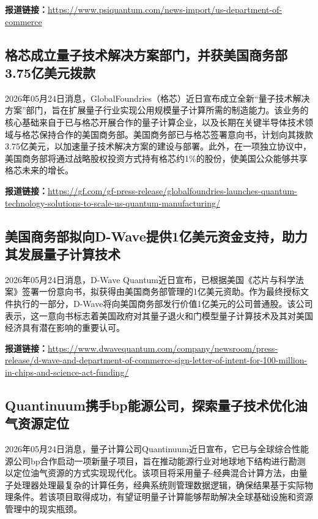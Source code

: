 \documentclass[12pt,a4paper]{ctexart}
\begin{document}
\noindent\textbf{报道链接：}\url{https://www.psiquantum.com/news-import/us-department-of-commerce}

\subsection{ 格芯成立量子技术解决方案部门，并获美国商务部3.75亿美元拨款 }

2026年05月24日消息，GlobalFoundries（格芯）近日宣布成立全新“量子技术解决方案”部门，旨在扩展量子行业实现公用规模量子计算所需的制造能力。该业务的核心基础来自于已与格芯开展合作的量子计算企业，以及长期在关键半导体技术领域与格芯保持合作的美国商务部。美国商务部已与格芯签署意向书，计划向其拨款3.75亿美元，以加速量子技术解决方案的建设与部署。此外，在一项独立协议中，美国商务部将通过战略股权投资方式持有格芯约1\%的股份，使美国公众能够共享格芯未来的增长。

\noindent\textbf{报道链接：}\url{https://gf.com/gf-press-release/globalfoundries-launches-quantum-technology-solutions-to-scale-us-quantum-manufacturing/}

\subsection{ 美国商务部拟向D-Wave提供1亿美元资金支持，助力其发展量子计算技术 }

2026年05月24日消息，D-Wave Quantum近日宣布，已根据美国《芯片与科学法案》签署一份意向书，拟获得由美国商务部管理的1亿美元资助。作为最终授标文件执行的一部分，D-Wave将向美国商务部发行价值1亿美元的公司普通股。该公司表示，这一意向书标志着美国政府对其量子退火和门模型量子计算技术及其对美国经济具有潜在影响的重要认可。

\noindent\textbf{报道链接：}\url{https://www.dwavequantum.com/company/newsroom/press-release/d-wave-and-department-of-commerce-sign-letter-of-intent-for-100-million-in-chips-and-science-act-funding/}

\subsection{ Quantinuum携手bp能源公司，探索量子技术优化油气资源定位 }

2026年05月24日消息，量子计算公司Quantinuum近日宣布，它已与全球综合性能源公司bp合作启动一项新量子项目，旨在推动能源行业对地球地下结构进行勘测以定位油气资源的方式实现现代化。该项目将采用量子-经典混合计算方法，由量子处理器处理最复杂的计算任务，经典系统则管理数据逻辑，确保结果基于实际物理条件。若该项目取得成功，有望证明量子计算能够帮助解决全球基础设施和资源管理中的现实瓶颈。
\end{document}
